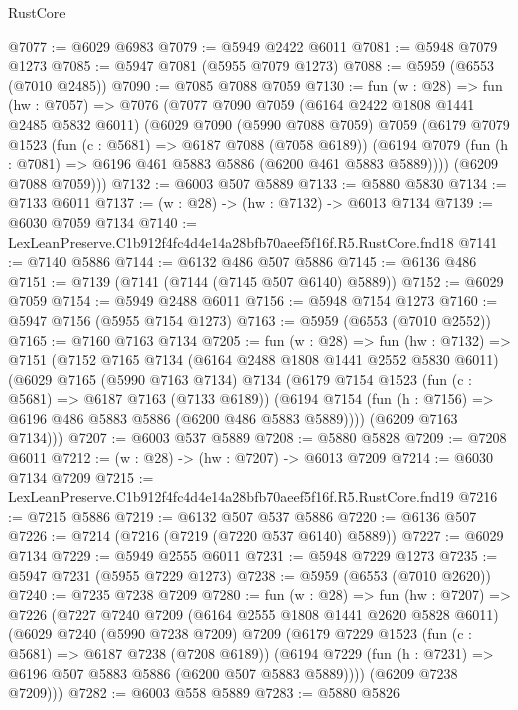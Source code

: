 \begin{lexlean}{RustCore}
\begin{coremodule}
@7077 := @6029 @6983
@7079 := @5949 @2422 @6011
@7081 := @5948 @7079 @1273
@7085 := @5947 @7081 (@5955 @7079 @1273)
@7088 := @5959 (@6553 (@7010 @2485))
@7090 := @7085 @7088 @7059
@7130 := fun (w : @28) =>
  fun (hw : @7057) =>
  @7076
    (@7077
      @7090
      @7059
      (@6164 @2422 @1808 @1441 @2485 @5832 @6011)
      (@6029
        @7090
        (@5990 @7088 @7059)
        @7059
        (@6179
          @7079
          @1523
          (fun (c : @5681) => @6187 @7088 (@7058 @6189))
          (@6194 @7079 (fun (h : @7081) => @6196 @461 @5883 @5886 (@6200 @461 @5883 @5889))))
        (@6209 @7088 @7059)))
@7132 := @6003 @507 @5889
@7133 := @5880 @5830
@7134 := @7133 @6011
@7137 := (w : @28) -> (hw : @7132) -> @6013 @7134
@7139 := @6030 @7059 @7134
@7140 := LexLeanPreserve.C1b912f4fc4d4e14a28bfb70aeef5f16f.R5.RustCore.fnd18
@7141 := @7140 @5886
@7144 := @6132 @486 @507 @5886
@7145 := @6136 @486
@7151 := @7139 (@7141 (@7144 (@7145 @507 @6140) @5889))
@7152 := @6029 @7059
@7154 := @5949 @2488 @6011
@7156 := @5948 @7154 @1273
@7160 := @5947 @7156 (@5955 @7154 @1273)
@7163 := @5959 (@6553 (@7010 @2552))
@7165 := @7160 @7163 @7134
@7205 := fun (w : @28) =>
  fun (hw : @7132) =>
  @7151
    (@7152
      @7165
      @7134
      (@6164 @2488 @1808 @1441 @2552 @5830 @6011)
      (@6029
        @7165
        (@5990 @7163 @7134)
        @7134
        (@6179
          @7154
          @1523
          (fun (c : @5681) => @6187 @7163 (@7133 @6189))
          (@6194 @7154 (fun (h : @7156) => @6196 @486 @5883 @5886 (@6200 @486 @5883 @5889))))
        (@6209 @7163 @7134)))
@7207 := @6003 @537 @5889
@7208 := @5880 @5828
@7209 := @7208 @6011
@7212 := (w : @28) -> (hw : @7207) -> @6013 @7209
@7214 := @6030 @7134 @7209
@7215 := LexLeanPreserve.C1b912f4fc4d4e14a28bfb70aeef5f16f.R5.RustCore.fnd19
@7216 := @7215 @5886
@7219 := @6132 @507 @537 @5886
@7220 := @6136 @507
@7226 := @7214 (@7216 (@7219 (@7220 @537 @6140) @5889))
@7227 := @6029 @7134
@7229 := @5949 @2555 @6011
@7231 := @5948 @7229 @1273
@7235 := @5947 @7231 (@5955 @7229 @1273)
@7238 := @5959 (@6553 (@7010 @2620))
@7240 := @7235 @7238 @7209
@7280 := fun (w : @28) =>
  fun (hw : @7207) =>
  @7226
    (@7227
      @7240
      @7209
      (@6164 @2555 @1808 @1441 @2620 @5828 @6011)
      (@6029
        @7240
        (@5990 @7238 @7209)
        @7209
        (@6179
          @7229
          @1523
          (fun (c : @5681) => @6187 @7238 (@7208 @6189))
          (@6194 @7229 (fun (h : @7231) => @6196 @507 @5883 @5886 (@6200 @507 @5883 @5889))))
        (@6209 @7238 @7209)))
@7282 := @6003 @558 @5889
@7283 := @5880 @5826

\end{coremodule}
\end{lexlean}
